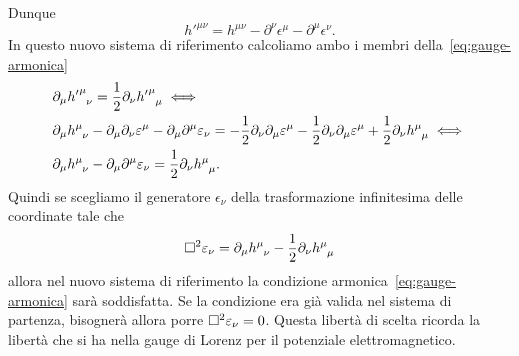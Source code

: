 Dunque
\begin{equation}
  h'^{\mu\nu} = h^{\mu\nu} - \partial^{\nu} \epsilon^{\mu} - \partial^{\mu}
  \epsilon^{\nu}.
\end{equation}
In questo nuovo sistema di riferimento calcoliamo ambo i membri
della~\eqref{eq:gauge-armonica}
\begin{equation}
  \begin{split}
    &\partial_{\mu} \tensor{{h'}}{^{\mu}_{\nu}} = \frac{1}{2}\partial_{\nu}
    \tensor{{h'}}{^{\mu}_{\mu}} \iff \\
    &\partial_{\mu} \tensor{h}{^{\mu}_{\nu}}
    - \partial_{\mu} \partial_{\nu} \epsilon^{\mu}
    - \partial_{\mu}\partial^{\mu} \epsilon_{\nu}
    = -\frac{1}{2} \partial_{\nu} \partial_{\mu} \epsilon^{\mu} -
    \frac{1}{2}\partial_{\nu} \partial_{\mu} \epsilon^{\mu} +
    \frac{1}{2} \partial_{\nu} \tensor{h}{^{\mu}_{\mu}} \iff \\
    &\partial_{\mu} \tensor{h}{^{\mu}_{\nu}}
    - \partial_{\mu}\partial^{\mu} \epsilon_{\nu}
    = \frac{1}{2} \partial_{\nu} \tensor{h}{^{\mu}_{\mu}}.
  \end{split}
\end{equation}
Quindi se scegliamo il generatore $\epsilon_{\nu}$ della trasformazione
infinitesima delle coordinate tale che
\begin{equation}
  \dalamb \epsilon_{\nu} = \partial_{\mu} \tensor{h}{^{\mu}_{\nu}} -
  \frac{1}{2} \partial_{\nu} \tensor{h}{^{\mu}_{\mu}}
\end{equation}
allora nel nuovo sistema di riferimento la condizione
armonica~\eqref{eq:gauge-armonica} sarà soddisfatta.  Se la condizione era già
valida nel sistema di partenza, bisognerà allora porre
$\Box^{2} \varepsilon_{\nu} = 0$.  Questa libertà di scelta ricorda la libertà che
si ha nella gauge di Lorenz per il potenziale elettromagnetico.


